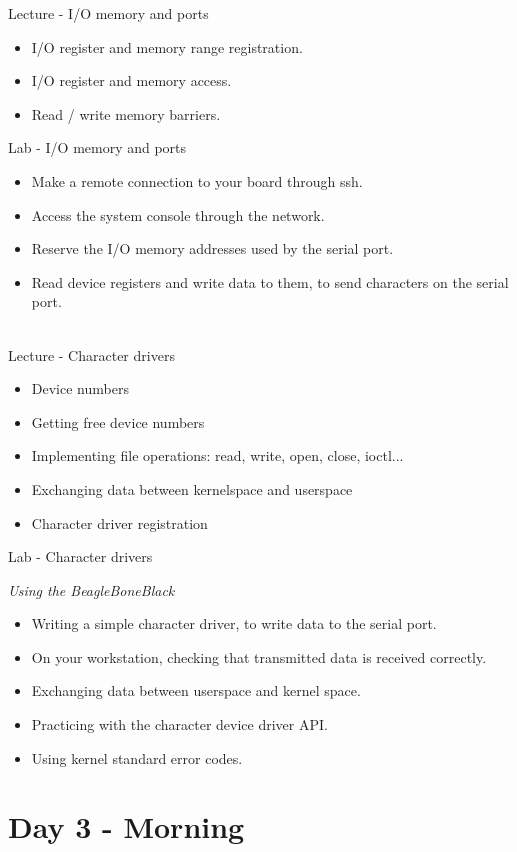 \documentclass[a4paper,12pt,obeyspaces,spaces,hyphens]{article}
\begin{document}
\feagendatwocolumn
{Lecture - I/O memory and ports}
{
  \begin{itemize}
  \item I/O register and memory range registration.
  \item I/O register and memory access.
  \item Read / write memory barriers.
  \end{itemize}
}
{Lab - I/O memory and ports}
{
  \begin{itemize}
  \item Make a remote connection to your board through ssh.
  \item Access the system console through the network.
  \item Reserve the I/O memory addresses used by the serial port.
  \item Read device registers and write data to them, to send
    characters on the serial port.
  \end{itemize}
}
\\
\feagendatwocolumn
{Lecture - Character drivers}
{
  \begin{itemize}
  \item Device numbers
  \item Getting free device numbers
  \item Implementing file operations: read, write, open, close,
    ioctl...
  \item Exchanging data between kernelspace and userspace
  \item Character driver registration
  \end{itemize}
}
{Lab - Character drivers}
{
  {\em Using the BeagleBoneBlack}
  \begin{itemize}
  \item Writing a simple character driver, to write data to the serial port.
  \item On your workstation, checking that transmitted data is received correctly.
  \item Exchanging data between userspace and kernel space.
  \item Practicing with the character device driver API.
  \item Using kernel standard error codes.
  \end{itemize}
}

\section{Day 3 - Morning}
\end{document}
